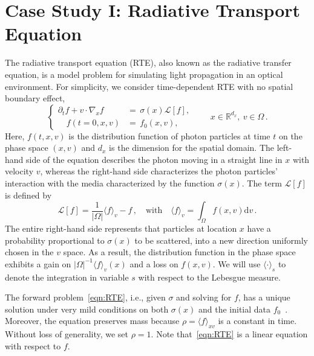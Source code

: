\documentclass[12pt]{amsart}
\newcommand{\rd}{\mathrm{d}}
\begin{document}
\section{Case Study I: Radiative Transport Equation}\label{sec:rte}
The radiative transport equation (RTE), also known as the radiative transfer equation, is a model problem for simulating light propagation in an optical environment. For  simplicity, we consider time-dependent RTE with no spatial boundary effect,
\begin{equation}\label{eqn:RTE}
\begin{cases}
\partial_t f +v\cdot\nabla_xf &= \, \sigma(x)\mathcal{L}[f], \\
\quad f(t=0,x,v) &= \, f_0 (x,v),
\end{cases}\qquad x\in \mathbb{R}^{d_x}, ~ v \in \Omega\,.
\end{equation}
Here, $f(t,x,v)$ is the distribution function of photon particles at time $t$ on the phase space $(x,v)$ and $d_x$ is the dimension for the spatial domain. The left-hand side of the equation describes the photon moving in a straight line in $x$ with velocity $v$, whereas the right-hand side characterizes the photon particles' interaction with the media characterized by the function $\sigma(x)$. The term $\mathcal{L}[f]$ is defined by
\begin{equation}\label{eq:f_v}
\mathcal{L}[f] = \frac{1}{|\Omega|} \langle f\rangle_v - f\,,\quad\text{with}\quad \langle f\rangle_v =  \int_\Omega f(x,v)\rd{v}\,.
\end{equation}
The entire right-hand side represents that particles at location $x$ have a probability proportional to $\sigma(x)$ to be scattered, into a new direction uniformly chosen in the $v$ space. As a result, the distribution function in the phase space exhibits a gain on $|\Omega|^{-1}\langle f\rangle_v(x)$ and a loss on $f(x,v)$. We will use $\langle\cdot\rangle_s$ to denote the integration in variable $s$ with respect to the Lebesgue measure. 


The forward problem~\eqref{eqn:RTE}, i.e., given $\sigma$ and solving for $f$, has a unique solution under very mild conditions on both $\sigma(x)$ and the initial data $f_0$~\cite{dautray1993mathematical,bal2006radiative}.
Moreover, the equation preserves mass because $\rho=\langle f\rangle_{xv}$ is a constant in time. Without loss of generality, we set $\rho=1$. Note that~\eqref{eqn:RTE} is a linear equation with respect to $f$.
\end{document}
